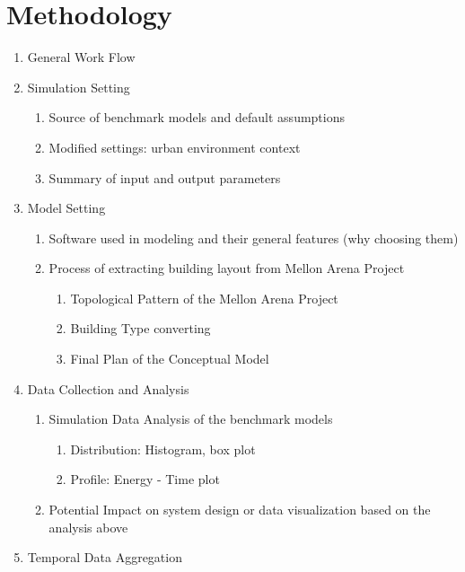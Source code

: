 \documentclass[hidelinks,12pt]{article}
\begin{document}
\section{Methodology}
  \begin{enumerate}[label*=\arabic*.]
  \item General Work Flow
  \item Simulation Setting
    \begin{enumerate}[label*=\arabic*.]
    \item Source of benchmark models and default assumptions
    \item Modified settings: urban environment context
    \item Summary of input and output parameters
    \end{enumerate}
  \item Model Setting
    \begin{enumerate}[label*=\arabic*.]
    \item Software used in modeling and their general features (why
      choosing them)
    \item Process of extracting building layout from Mellon Arena
      Project
      \begin{enumerate}[label*=\arabic*.]
      \item Topological Pattern of the Mellon Arena Project
      \item Building Type converting
      \item Final Plan of the Conceptual Model
      \end{enumerate}
    \end{enumerate}
    \item Data Collection and Analysis
      \begin{enumerate}[label*=\arabic*.]
      \item Simulation Data Analysis of the benchmark models
        \begin{enumerate}[label*=\arabic*.]
        \item Distribution: Histogram, box plot
        \item Profile: Energy - Time plot
        \end{enumerate}
      \item Potential Impact on system design or data visualization
        based on the analysis above
      \end{enumerate}
    \item Temporal Data Aggregation
      \begin{enumerate}[label*=\arabic*.]

\end{enumerate}
\end{enumerate}
\end{document}
